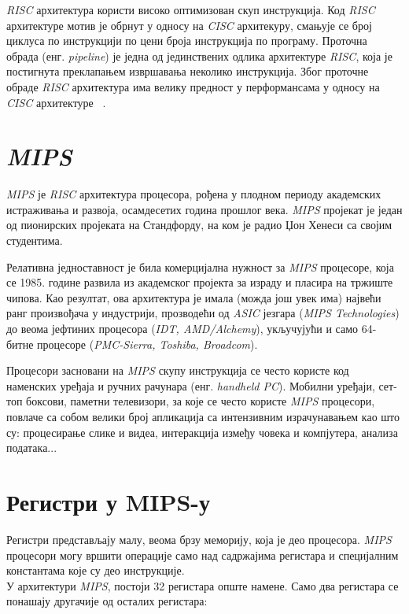 \documentclass[12pt,oneside]{memoir}
\begin{document}
\indent \textit{RISC} архитектура користи високо оптимизован скуп инструкција. Код \textit{RISC} архитектуре мотив је обрнут у односу на \textit{CISC} архитекуру, смањује се број циклуса по инструкцији по цени броја инструкција по програму. Проточна обрада (енг. \textit{pipeline}) је једна од јединствених одлика архитектуре \textit{RISC}, која је постигнута преклапањем извршавања неколико инструкција. Због проточне обраде \textit{RISC} архитектура има велику предност у перформансама у односу на \textit{CISC} архитектуре ~\cite{rcRef}.



\section{\textit{MIPS}}
\label{sec_mips}

\indent \textit{MIPS} је \textit{RISC} архитектура процесора, рођена у плодном периоду академских истраживања и развоја, осамдесетих година прошлог века. \textit{MIPS} пројекат је један од пионирских пројеката на Стандфорду, на ком је радио Џон Хенеси са својим студентима.

\indent Релативна једноставност је била комерцијална нужност за \textit{MIPS} процесоре, која се 1985. године развила из академског пројекта за израду и пласира на тржиште чипова. Као резултат, ова архитектура је имала (можда још увек има) највећи ранг произвођача у индустрији, прозводећи од \textit{ASIC} језгара (\textit{MIPS Technologies}) до веома јефтиних процесора (\textit{IDT, AMD/Alchemy}), укључујући и само 64-битне процесоре (\textit{PMC-Sierra, Toshiba, Broadcom}).

\indent Процесори засновани на \textit{MIPS} скупу инструкција се често користе код наменских уређаја и ручних рачунара (енг. \textit{handheld PC}). Мобилни уређаји, сет-топ боксови, паметни телевизори, за које се често користе \textit{MIPS} процесори, повлаче са собом велики број апликација са интензивним израчунавањем као што су: процесирање слике и видеа, интеракција између човека и компјутера, анализа података...

\section{Регистри у MIPS-у}
\label{registri}

\indent Регистри представљају малу, веома брзу меморију, која је део процесора. \textit{MIPS} процесори могу вршити операције само над садржајима регистара и специјалним константама које су део инструкције. \\
\indent У архитектури \textit{MIPS}, постоји 32 регистара опште намене. Само два регистара се понашају другачије од осталих регистара:
\end{document}
